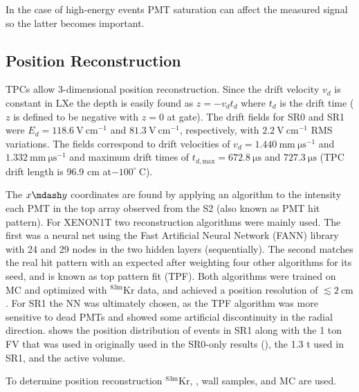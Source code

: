 In the case of high-energy events PMT saturation can
affect the measured signal so the latter becomes important.



\subsection{Position Reconstruction}
\label{subsec:det_char_position_reconstruction}
TPCs allow 3-dimensional position reconstruction.  Since the drift velocity $v_d$
is constant in LXe the depth is easily found as $z = -v_d t_d$ where $t_d$ is the drift time ($z$ is defined to be negative with
$z = 0$ at gate).  The drift fields for SR0 and SR1 were $E_d = 118.6\ \mathrm{V\ cm^{-1}}$ and $81.3\ \mathrm{V\ cm^{-1}}$,
respectively, with $2.2\ \mathrm{V\ cm^{-1}}$ RMS variations.  The fields correspond to drift velocities of
$v_d = 1.440\ \mathrm{mm\ \mu s^{-1}}$ and $1.332\ \mathrm{mm\ \mu s^{-1}}$ and
maximum drift times of $t_{d, \mathrm{max}} = 672.8\ \mathrm{\mu s}$ and $727.3\ \mathrm{\mu s}$ (TPC drift length is 96.9
cm at$-100^{\circ}\ \mathrm{C}$).

The $x \mdash y$ coordinates are found by applying an algorithm to the intensity each PMT in the top array observed from the S2 (also known as
PMT hit pattern).  For XENON1T two reconstruction algorithms were mainly used.  The first was a neural net using the Fast Artificial
Neural Network (FANN) library with 24 and 29 nodes in the two hidden layers (sequentially).  The second matches the real hit pattern with
an expected after weighting four other algorithms for its seed, and is known as top pattern fit (TPF).  Both algorithms were trained on MC
and optimized with $\mathrm{^{83m}Kr}$ data, and achieved a position resolution of $\lesssim 2\ \mathrm{cm}$.  For SR1 the NN was ultimately
chosen, as the TPF algorithm was more sensitive to dead PMTs and showed some artificial discontinuity in the radial
direction.   shows the position distribution of events in SR1 along with the 1 ton FV
that was used in originally used in the SR0-only results (), the 1.3 t used in SR1, and the active volume.

To determine position reconstruction $\mathrm{^{83m}Kr}$, , wall samples, and MC are used.

